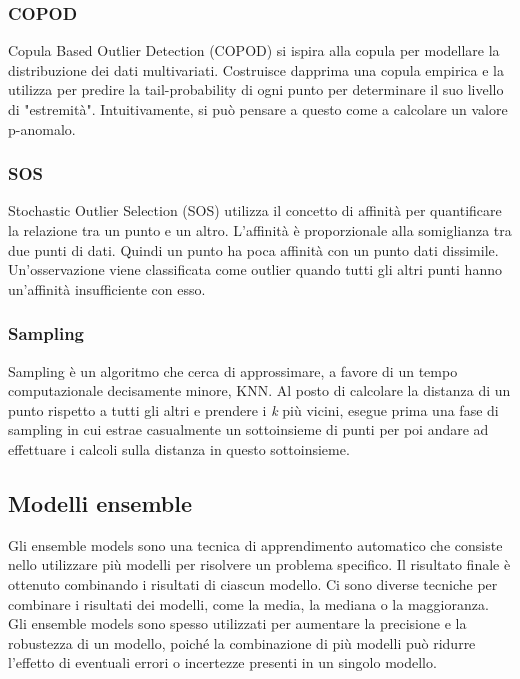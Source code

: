 \subsubsection{COPOD}
Copula Based Outlier Detection (COPOD) \cite{li2020copod} si ispira alla copula per modellare la distribuzione dei dati multivariati. Costruisce dapprima una copula empirica e la utilizza per predire la tail-probability di ogni punto per determinare il suo
livello di "estremità". Intuitivamente, si può pensare a questo come a calcolare
un valore p-anomalo.

\subsubsection{SOS}
Stochastic Outlier Selection (SOS) \cite{janssens2012stochastic} utilizza il concetto di affinità per quantificare la relazione tra un punto e un altro. L'affinità è proporzionale alla somiglianza tra due punti di dati. Quindi un punto ha poca affinità con un punto dati dissimile. 
Un'osservazione viene classificata come outlier quando tutti gli altri punti hanno un'affinità insufficiente con esso.

\subsubsection{Sampling}
Sampling \cite{sugiyama2013rapid} è un algoritmo che cerca di approssimare, a favore di un tempo computazionale decisamente minore, KNN. Al posto di calcolare la distanza di un punto rispetto a tutti gli altri e prendere i \textit{k} più vicini, esegue prima una fase di sampling in cui estrae casualmente un sottoinsieme di punti per poi andare ad effettuare i calcoli sulla distanza in questo sottoinsieme.

\subsection{Modelli ensemble}
Gli ensemble models sono una tecnica di apprendimento automatico che consiste nello utilizzare più modelli per risolvere un problema specifico. Il risultato finale è ottenuto combinando i risultati di ciascun modello. Ci sono diverse tecniche per combinare i risultati dei modelli, come la media, la mediana o la maggioranza. Gli ensemble models sono spesso utilizzati per aumentare la precisione e la robustezza di un modello, poiché la combinazione di più modelli può ridurre l'effetto di eventuali errori o incertezze presenti in un singolo modello.

